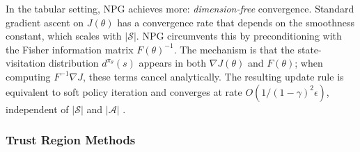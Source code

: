 In the tabular setting, NPG achieves more: \emph{dimension-free} convergence. Standard gradient ascent on $J(\theta)$ has a convergence rate that depends on the smoothness constant, which scales with $|\mathcal{S}|$. NPG circumvents this by preconditioning with the Fisher information matrix $F(\theta)^{-1}$. The mechanism is that the state-visitation distribution $d^{\pi_\theta}(s)$ appears in both $\nabla J(\theta)$ and $F(\theta)$; when computing $F^{-1} \nabla J$, these terms cancel analytically. The resulting update rule is equivalent to soft policy iteration and converges at rate $O(1/(1-\gamma)^2 \epsilon)$, independent of $|\mathcal{S}|$ and $|\mathcal{A}|$ \citep{xiao2022convergence}.

\subsubsection{Trust Region Methods}

